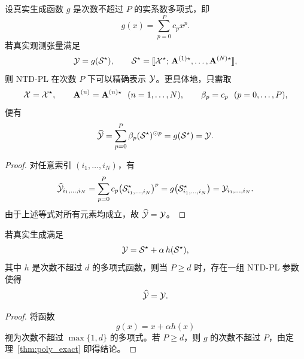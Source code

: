 \begin{theorem}[多项式链接下的精确表达]
\label{thm:poly_exact}
设真实生成函数 $g$ 是次数不超过 $P$ 的实系数多项式，即
\begin{equation}
g(x)=\sum_{p=0}^{P} c_p x^p.
\end{equation}
若真实观测张量满足
\begin{equation}
\mathcal{Y} = g(\mathcal{S}^\star),
\qquad
\mathcal{S}^\star
=
\llbracket
\mathcal{X}^\star;\,
\mathbf A^{(1)\star},\dots,\mathbf A^{(N)\star}
\rrbracket,
\end{equation}
则 NTD-PL 在次数 $P$ 下可以精确表示 $\mathcal{Y}$。更具体地，只需取
\begin{equation}
\mathcal{X}=\mathcal{X}^\star,\qquad
\mathbf A^{(n)}=\mathbf A^{(n)\star}\ \ (n=1,\dots,N),\qquad
\beta_p=c_p\ \ (p=0,\dots,P),
\end{equation}
便有
\begin{equation}
\widehat{\mathcal{Y}}
=
\sum_{p=0}^{P}\beta_p (\mathcal{S}^\star)^{\odot p}
=
g(\mathcal{S}^\star)
=
\mathcal{Y}.
\end{equation}
\end{theorem}

\begin{proof}
对任意索引 $(i_1,\dots,i_N)$，有
\begin{equation}
\widehat{\mathcal{Y}}_{i_1,\dots,i_N}
=
\sum_{p=0}^{P} c_p
\bigl(\mathcal{S}^\star_{i_1,\dots,i_N}\bigr)^p
=
g\!\left(\mathcal{S}^\star_{i_1,\dots,i_N}\right)
=
\mathcal{Y}_{i_1,\dots,i_N}.
\end{equation}
由于上述等式对所有元素均成立，故 $\widehat{\mathcal{Y}}=\mathcal{Y}$。
\end{proof}

\begin{corollary}[多项式非线性下的精确恢复]
\label{cor:poly_recovery}
若真实生成满足
\begin{equation}
\mathcal{Y}=\mathcal{S}^\star + \alpha\, h(\mathcal{S}^\star),
\end{equation}
其中 $h$ 是次数不超过 $d$ 的多项式函数，则当 $P\ge d$ 时，存在一组 NTD-PL 参数使得
\begin{equation}
\widehat{\mathcal{Y}}=\mathcal{Y}.
\end{equation}
\end{corollary}

\begin{proof}
将函数
\begin{equation}
g(x)=x+\alpha h(x)
\end{equation}
视为次数不超过 $\max\{1,d\}$ 的多项式。若 $P\ge d$，则 $g$ 的次数不超过 $P$，由定理~\ref{thm:poly_exact} 即得结论。
\end{proof}

